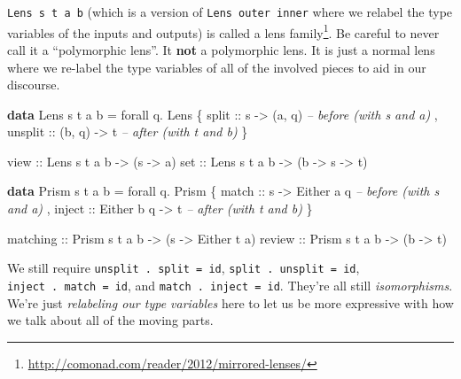 \documentclass[]{article}
\newenvironment{Shaded}{}{}
\newcommand{\CommentTok}[1]{\textcolor[rgb]{0.38,0.63,0.69}{\textit{#1}}}
\newcommand{\DataTypeTok}[1]{\textcolor[rgb]{0.56,0.13,0.00}{#1}}
\newcommand{\FunctionTok}[1]{\textcolor[rgb]{0.02,0.16,0.49}{#1}}
\newcommand{\KeywordTok}[1]{\textcolor[rgb]{0.00,0.44,0.13}{\textbf{#1}}}
\newcommand{\NormalTok}[1]{#1}
\newcommand{\OtherTok}[1]{\textcolor[rgb]{0.00,0.44,0.13}{#1}}
\renewcommand{\href}[2]{#2\footnote{\url{#1}}}
\begin{document}
\begin{enumerate}
  \texttt{Lens\ s\ t\ a\ b} (which is a version of
  \texttt{Lens\textquotesingle{}\ outer\ inner} where we relabel the type
  variables of the inputs and outputs) is called a
  \href{http://comonad.com/reader/2012/mirrored-lenses/}{lens family}. Be
  careful to never call it a ``polymorphic lens''. It \textbf{not} a polymorphic
  lens. It is just a normal lens where we re-label the type variables of all of
  the involved pieces to aid in our discourse.

\begin{Shaded}
\begin{Highlighting}[]
\KeywordTok{data} \DataTypeTok{Lens}\NormalTok{ s t a b }\FunctionTok{=}\NormalTok{ forall q}\FunctionTok{.} \DataTypeTok{Lens}
\NormalTok{    \{}\OtherTok{ split   ::}\NormalTok{ s }\OtherTok{->}\NormalTok{ (a, q)        }\CommentTok{-- before (with s and a)}
\NormalTok{    ,}\OtherTok{ unsplit ::}\NormalTok{ (b, q) }\OtherTok{->}\NormalTok{ t        }\CommentTok{-- after  (with t and b)}
\NormalTok{    \}}

\OtherTok{view ::} \DataTypeTok{Lens}\NormalTok{ s t a b }\OtherTok{->}\NormalTok{ (s }\OtherTok{->}\NormalTok{ a)}
\OtherTok{set  ::} \DataTypeTok{Lens}\NormalTok{ s t a b }\OtherTok{->}\NormalTok{ (b }\OtherTok{->}\NormalTok{ s }\OtherTok{->}\NormalTok{ t)}

\KeywordTok{data} \DataTypeTok{Prism}\NormalTok{ s t a b }\FunctionTok{=}\NormalTok{ forall q}\FunctionTok{.} \DataTypeTok{Prism}
\NormalTok{    \{}\OtherTok{ match  ::}\NormalTok{ s }\OtherTok{->} \DataTypeTok{Either}\NormalTok{ a q     }\CommentTok{-- before (with s and a)}
\NormalTok{    ,}\OtherTok{ inject ::} \DataTypeTok{Either}\NormalTok{ b q }\OtherTok{->}\NormalTok{ t     }\CommentTok{-- after  (with t and b)}
\NormalTok{    \}}


\OtherTok{matching ::} \DataTypeTok{Prism}\NormalTok{ s t a b }\OtherTok{->}\NormalTok{ (s }\OtherTok{->} \DataTypeTok{Either}\NormalTok{ t a)}
\OtherTok{review   ::} \DataTypeTok{Prism}\NormalTok{ s t a b }\OtherTok{->}\NormalTok{ (b }\OtherTok{->}\NormalTok{ t)}
\end{Highlighting}
\end{Shaded}

  We still require \texttt{unsplit\ .\ split\ =\ id},
  \texttt{split\ .\ unsplit\ =\ id}, \texttt{inject\ .\ match\ =\ id}, and
  \texttt{match\ .\ inject\ =\ id}. They're all still \emph{isomorphisms}. We're
  just \emph{relabeling our type variables} here to let us be more expressive
  with how we talk about all of the moving parts.


\end{enumerate}
\end{document}
